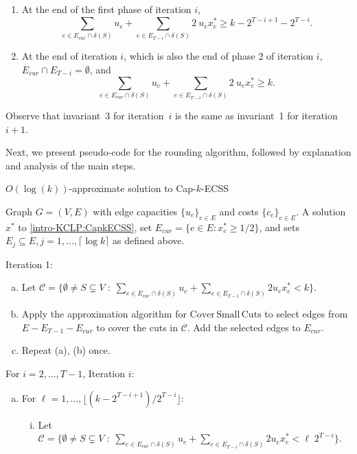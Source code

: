 \documentclass[11pt]{article}
\newcommand{\C}{\mathscr{C}}
\newcommand\ASC{\mathrm{Cover\,Small\,Cuts}}
\newcommand{\alphatwo}{2}
\begin{document}
{\begin{enumerate}
    \item At the end of the first phase of iteration $i$,
    \[
    \sum_{e\in E_{cur} \cap \delta(S)}u_e + \sum_{e\in E_{T-i} \cap \delta(S)}\alphatwo\  u_ex^*_e \geq k-2^{T-i+1} - 2^{T-i}.
    \]

    \item At the end of iteration $i$, which is also the end of phase
    2 of iteration $i$, $E_{cur} \cap E_{T-i} = \emptyset$, and
    $$\sum_{e\in E_{cur} \cap \delta(S)}u_e + \sum_{e\in E_{T-i} \cap \delta(S)} \alphatwo\  u_ex^*_e \geq k.$$
\end{enumerate}

Observe that invariant~3 for iteration~$i$ is the same as invariant~1 for iteration~$i+1$.

Next, we present pseudo-code for the rounding algorithm, followed by explanation and analysis of the main steps.

{
\begin{algorithm}[H]
    \caption{$O(\log(k))$-approximate solution to Cap-$k$-ECSS}\label{alg:capkECSS}
    \begin{algorithmic}[1]
        \Require Graph $G = (V,E)$ with edge capacities $\{u_e\}_{e \in E}$ and costs $\{c_e\}_{e\in E}$.  A solution $x^*$ to \eqref{intro-KCLP:CapkECSS}, set $E_{cur} = \{e\in E:x^*_e \geq 1/2\}$, and sets $E_j \subseteq E, j = 1,...,\lceil \log k \rceil$ as defined above.

        \State Iteration 1:
        \begin{enumerate}[(a)]
        \item Let $\C = \{\emptyset\neq S \subsetneq V \; : \; \sum_{e \in E_{cur} \cap \delta(S)}u_e + \sum_{e \in E_{T-1} \cap \delta(S)} 2 u_e x^*_e < k\}$.  
        
        \item  Apply the approximation algorithm for $\ASC$ to select edges from $E - E_{T-1} - E_{cur}$ to cover the cuts in $\C$.  Add the selected edges to $E_{cur}$.

        \item Repeat (a), (b) once.
    \end{enumerate}

    \State For $i = 2,...,T-1$, Iteration $i$:
    \begin{enumerate}[(a)]
        \item For $\ell = 1,...,\lfloor (k-2^{T-i+1})/2^{T-i} \rfloor$:
        \begin{enumerate}[(i)]
            \item Let $\C = \{\emptyset\neq S \subsetneq V \; : \; \sum_{e \in E_{cur} \cap \delta(S)}u_e + \sum_{e \in E_{T-i} \cap \delta(S)} 2 u_e x^*_e < \ell\; 2^{T-i}\}$.  


\end{enumerate}
\end{enumerate}
\end{algorithmic}
\end{algorithm}}}
\end{document}
